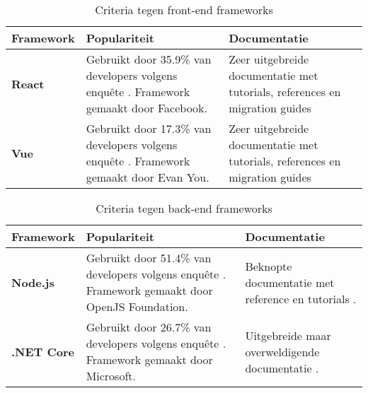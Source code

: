 \begin{table}[hbt!]
  \centering
  \caption{Criteria tegen front-end frameworks}
  \vspace*{.5\baselineskip}
  \begin{tabular}{|p{.15\linewidth}|p{.4\linewidth}|p{.4\linewidth}|}
  \hline
  \textbf{Framework} & \textbf{Populariteit} & \textbf{Documentatie} \\ \hline
    \textbf{React} &
    Gebruikt door 35.9\% van developers volgens enquête \cite{stack-overflow-survey-2020-technology-web-frameworks}. Framework \newline gemaakt door Facebook. &
    Zeer uitgebreide documentatie met \newline tutorials, references en migration guides \cite{reactjs-docs}
    \\ \hline
    
    \textbf{Vue} &
    Gebruikt door 17.3\% van developers volgens enquête \cite{stack-overflow-survey-2020-technology-web-frameworks}. Framework \newline gemaakt door Evan You. & 
    Zeer uitgebreide documentatie met \newline tutorials, references en migration guides \cite{vue-docs}
    \\ \hline
  \end{tabular}
  \label{table:ch6-criteria-compared-against-frontend-frameworks}
\end{table}

\begin{table}[hbt!]
  \centering
  \caption{Criteria tegen back-end frameworks}
  \vspace*{.5\baselineskip}
  \begin{tabular}{|p{.15\linewidth}|p{.4\linewidth}|p{.4\linewidth}|}
  \hline
  \textbf{Framework} & \textbf{Populariteit} & \textbf{Documentatie} \\ \hline
    \textbf{Node.js} &
    Gebruikt door 51.4\% van developers volgens enquête \cite{stack-overflow-survey-2020-popular-framework-libraries-tools}. Framework \newline gemaakt door OpenJS Foundation. &
    Beknopte documentatie met reference en tutorials \cite{nodejs-docs}.
    \\ \hline

    \textbf{.NET Core} &
    Gebruikt door 26.7\% van developers volgens enquête \cite{stack-overflow-survey-2020-popular-framework-libraries-tools}. Framework \newline gemaakt door Microsoft. &
    Uitgebreide maar overweldigende \newline documentatie \cite{dotnet-core-docs}.
    \\ \hline
  \end{tabular}
  \label{table:ch6-criteria-compared-against-backend-frameworks}
\end{table}

